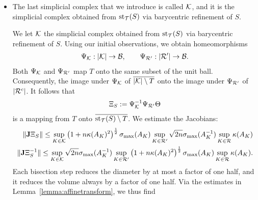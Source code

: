 \documentclass[10pt,a4paper]{article}
\newcommand{\todo}[1]{{\color{RedOrange}\textbf{#1}}}
\begin{document}
\begin{itemize}
        \item 
        The last simplicial complex that we introduce is called ${\mathcal K}$,
        and it is the simplicial complex obtained from $\operatorname{st}_{{\mathcal T}}(S)$ via barycentric refinement of $S$. 
        
        We let ${\mathcal K}$ the simplicial complex obtained from $\operatorname{st}_{{\mathcal T}}(S)$ via barycentric refinement of $S$. 
        Using our initial observations, we obtain homeomorphisms 
        \begin{align*}
            \Psi_{{\mathcal K} } : |{\mathcal K}| \rightarrow {\mathcal B},
            \qquad 
            \Psi_{{\mathcal R}'} : |{\mathcal R}'| \rightarrow {\mathcal B}.
        \end{align*}
        Both $\Psi_{{\mathcal K}}$ and $\Psi_{{\mathcal R}'}$ map $T$ onto the same subset of the unit ball.
        Consequently, the image under $\Psi_{{\mathcal K}}$ of $\overline{|{\mathcal K}| \setminus T}$
        onto the image under $\Psi_{{\mathcal R}'}$ of $|{\mathcal R}^{c}|$.
        It follows that 
        \begin{align*}
            \Xi_{S} := \Psi_{{\mathcal K}}^{-1} \Psi_{{\mathcal R}'} \Theta
        \end{align*}
        is a mapping from $T$ onto $\overline{\operatorname{st}_{{\mathcal T}}(S) \setminus T}$.
        We estimate the Jacobians: 
        \begin{align*}
            \| {\mathbf{J}} \Xi_{S} \| 
            \leq 
            \sup_{ K \in {\mathcal K}  }
            \left( 1 + n \kappa(A_{K})^{2} \right)^{\frac 1 2}
            \sigma_{\max}(A_{K}) 
            \sup_{ K \in {\mathcal R}' } 
            \sqrt{2n} 
            \sigma_{\max}(A_{K}^{-1}) 
            \sup_{ K \in {\mathcal R}  } \kappa(A_{K})
            \\
            \| {\mathbf{J}} \Xi_{S}^{-1} \| 
            \leq 
            \sup_{ K \in {\mathcal K}  }
            \sqrt{2n} 
            \sigma_{\max}(A_{K}^{-1}) 
            \sup_{ K \in {\mathcal R}' } 
            \left( 1 + n \kappa(A_{K})^{2} \right)^{\frac 1 2}
            \sigma_{\max}(A_{K}) 
            \sup_{ K \in {\mathcal R}  } \kappa(A_{K})
            .
        \end{align*}
        \color{red}
        Each bisection step reduces the diameter by at most a factor of one half,
        and it reduces the volume always by a factor of one half. 
        Via the estimates in Lemma~\ref{lemma:affinetransform}, we thus find 
        \begin{align*}

\end{align*}
\end{itemize}
\end{document}
